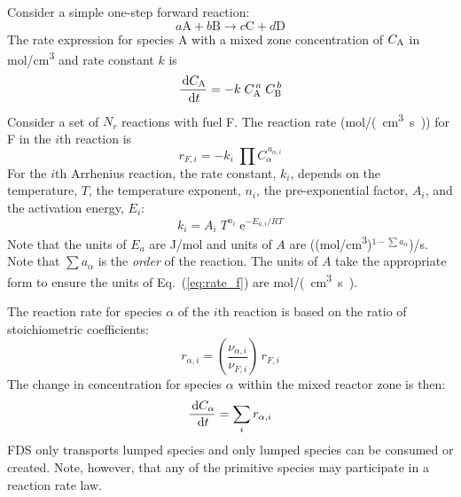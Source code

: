 Consider a simple one-step forward reaction:
\begin{equation}\label{eq:generic_1step}
a\mathrm{A} + b\mathrm{B} \rightarrow c\mathrm{C} + d\mathrm{D}
\end{equation}
The rate expression for species A with a mixed zone concentration of $C_{\mbox{\scriptsize A}}$ in \si{mol/cm^3} and rate constant $k$ is
\begin{equation}\label{eq:generic_rate}
\frac{\,\mathrm{d} C_{\mbox{\scriptsize A}}}{\,\mathrm{d} t}= -k\; C_{\mbox{\scriptsize A}}^{\,a}\; C_{\mbox{\scriptsize B}}^{\,b}
\end{equation}
Consider a set of $N_r$ reactions with fuel F. The reaction rate (\si{mol/(cm^3.s)}) for F in the $i$th reaction is
\begin{equation}\label{eq:rate_f}
r_{\si{F},i}= -k_{i}\; \prod C_{\alpha}^{\,a_{\alpha,i}}
\end{equation}
For the $i$th Arrhenius reaction, the rate constant, $k_i$, depends on the temperature, $T$, the temperature exponent, $n_i$, the pre-exponential factor, $A_i$, and the activation energy, $E_i$:
\begin{equation}\label{eq:rate_cons}
k_i = A_i\;T^{n_i}\;\mathrm{e}^{-E_{a,i}/RT}
\end{equation}
Note that the units of $E_a$ are J/mol and units of $A$ are ((\si{mol/cm^3})$^{1-\sum a_{\alpha}}$)/s.  Note that $\sum a_{\alpha}$ is the \emph{order} of the reaction.  The units of $A$ take the appropriate form to ensure the units of Eq.~(\ref{eq:rate_f}) are \si{mol/(cm^3.s)}.

The reaction rate for species $\alpha$ of the $i$th reaction is based on the ratio of stoichiometric coefficients:
\begin{equation}\label{eq:rate_a}
r_{\alpha,i}= \left(\frac{\nu_{\alpha,i}}{\nu_{F,i}}\right)\,r_{\si{F},i}
\end{equation}
The change in concentration for species $\alpha$ within the mixed reactor zone is then:
\begin{equation}\label{rate_expression}
\frac{\,\mathrm{d} C_{\alpha}}{\,\mathrm{d} t} = \sum_{i} r_{\alpha,i}
\end{equation}
FDS only transports lumped species and only lumped species can be consumed or created.  Note, however, that any of the primitive species may participate in a reaction rate law.

